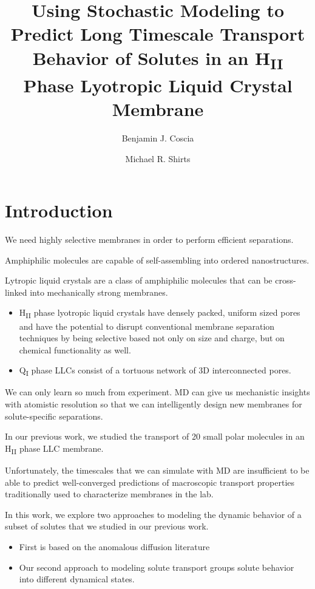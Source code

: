 \documentclass{article}
\title{Using Stochastic Modeling to Predict Long Timescale Transport Behavior of Solutes in an H\textsubscript{II} Phase Lyotropic Liquid Crystal Membrane}
\author{Benjamin J. Coscia \and Michael R. Shirts}
\begin{document}
  \graphicspath{{./figures/}}
  \maketitle

  \section{Introduction}

  We need highly selective membranes in order to perform efficient separations.

  Amphiphilic molecules are capable of self-assembling into ordered nanostructures.

  Lytropic liquid crystals are a class of amphiphilic molecules that can be cross-linked
  into mechanically strong membranes.
  \begin{itemize}
  	\item H\textsubscript{II} phase lyotropic liquid crystals have densely packed, uniform
	sized pores and have the potential to disrupt conventional membrane separation
	techniques by being selective based not only on size and charge, but on chemical
	functionality as well.
	\item Q\textsubscript{I} phase LLCs consist of a tortuous network of 3D interconnected
	pores.
  \end{itemize}

  We can only learn so much from experiment. MD can give us mechanistic insights with
  atomistic resolution so that we can intelligently design new membranes for 
  solute-specific separations.

  In our previous work, we studied the transport of 20 small polar molecules
  in an H\textsubscript{II} phase LLC membrane. 

  Unfortunately, the timescales that we can simulate with MD are insufficient to be
  able to predict well-converged predictions of macroscopic transport properties 
  traditionally used to characterize membranes in the lab.


  In this work, we explore two approaches to modeling the dynamic behavior of 
  a subset of solutes that we studied in our previous work.
  \begin{itemize}
  	\item First is based on the anomalous diffusion literature
  	\item Our second approach to modeling solute transport groups solute behavior
    into different dynamical states.
  \end{itemize}
\end{document}
